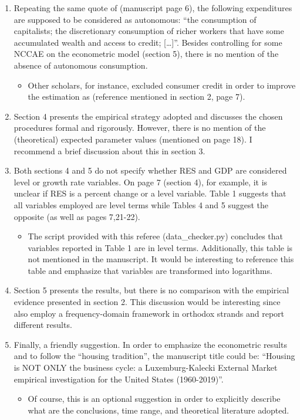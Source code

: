 \documentclass[11pt]{article}
\begin{document}
\begin{enumerate}
\item Repeating the same quote  of \textcite[p.~71]{serrano_long_1995} (manuscript page 6), the following expenditures are supposed to be considered as autonomous: ``the consumption of capitalists; the discretionary consumption of richer workers that have some accumulated wealth and access to credit; [\ldots{}]''. Besides controlling for some  NCCAE on the econometric model (section 5), there is no mention of the absence of autonomous consumption.

\begin{itemize}
\item Other scholars, for instance, excluded consumer credit in order to improve the estimation as \textcite{girardi_long-run_2016} (reference mentioned in section 2, page 7).
\end{itemize}

\item Section 4 presents the empirical strategy adopted and discusses the chosen procedures formal and rigorously.  However, there is no mention of the (theoretical) expected parameter values (mentioned on page 18). I recommend a brief discussion about this in section 3.

\item Both sections 4 and 5 do not specify whether RES and GDP are considered level or growth rate variables. On page 7 (section 4), for example, it is unclear if RES is a percent change or a level variable. Table 1 suggests that all variables employed are level terms while Tables 4 and 5 suggest  the opposite (as well as pages 7,21-22).

\begin{itemize}
\item The script provided with this referee (data\_checker.py) concludes that variables reported in Table 1 are in level terms. Additionally, this table is not mentioned in the manuscript. It would be interesting to reference this table and emphasize that variables are transformed into logarithms.
\end{itemize}

\item Section 5 presents the results, but there is no comparison with the empirical evidence presented in section 2. This discussion would be interesting since \textcite{huang_is_2020} also employ a frequency-domain framework in orthodox strands and report different results.

\item Finally, a friendly suggestion. In order to emphasize the econometric results and to follow the ``housing tradition'', the manuscript title could be: ``Housing is NOT ONLY the business cycle: a Luxemburg-Kalecki External Market empirical investigation for the United States (1960-2019)''.

\begin{itemize}
\item Of course, this is an optional suggestion in order to explicitly describe what are the conclusions, time range, and theoretical literature adopted.
\end{itemize}
\end{enumerate}
\end{document}
